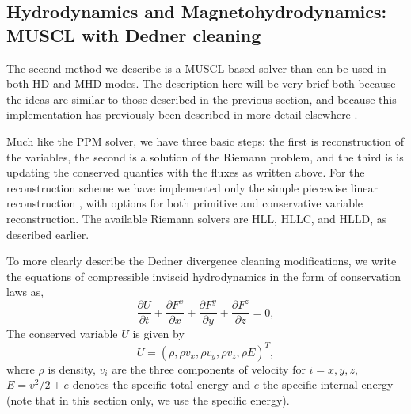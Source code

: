 \subsection{Hydrodynamics and Magnetohydrodynamics: MUSCL with Dedner cleaning}
\label{sec.num.hydro-muscl}

The second method we describe is a MUSCL-based solver than can be used in both HD and MHD modes.  The description here will be very brief both because the ideas are similar to those described in the previous section, and because this implementation has previously
been described in more detail elsewhere \citep{WangAbelZhang08, WangAbel09}.

Much like the PPM solver, we have three basic steps: the first is
reconstruction of the variables, the second is a solution of the
Riemann problem, and the third is is updating the conserved quanties
with the fluxes as written above.
For the reconstruction scheme we have implemented only the simple
piecewise linear reconstruction \citep{1979JCoPh..32..101V, 1985JCoPh..59..264C},
with options for both primitive and conservative variable reconstruction.
The available Riemann solvers are HLL, HLLC, and HLLD, as described earlier.

To more clearly describe the Dedner divergence cleaning modifications, we write the equations of compressible inviscid hydrodynamics in the form of conservation laws as,
\begin{equation}
 \frac{\partial{U}}{\partial{t}} +
 \frac{\partial{F^x}}{\partial{x}} + \frac{\partial{F^y}}{\partial{y}} + \frac{\partial{F^z}}{\partial{z}}= 0, \label{hydro}
\end{equation}
The conserved variable $U$ is given by
\begin{equation}
 U = (\rho, \rho v_x, \rho v_y, \rho v_z, \rho E)^{T},
\end{equation} 
where $\rho$ is density, $v_i$ are the three components of velocity
for $i={x,y,z}$, $E=v^2/2 + e$ denotes the specific total energy and $e$ the
specific internal energy (note that in this section only, we use the specific
energy).

